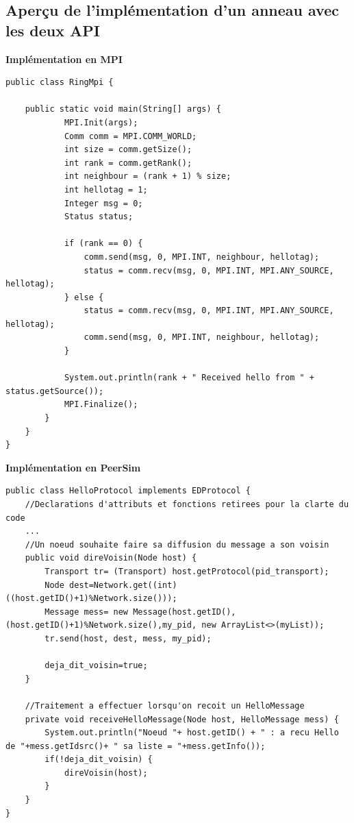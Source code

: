 \documentclass{article}
\begin{document}
			
			\subsection{Aperçu de l'implémentation d'un anneau avec les deux API}
                
            \vspace*{5mm}

                {\bfseries Implémentation en MPI}
				\begin{lstlisting}
public class RingMpi {

	public static void main(String[] args) {
			MPI.Init(args);
			Comm comm = MPI.COMM_WORLD;
			int size = comm.getSize();
			int rank = comm.getRank();
			int neighbour = (rank + 1) % size;
			int hellotag = 1;
			Integer msg = 0;
            Status status;
            
			if (rank == 0) {
				comm.send(msg, 0, MPI.INT, neighbour, hellotag);
				status = comm.recv(msg, 0, MPI.INT, MPI.ANY_SOURCE, hellotag);
			} else {
				status = comm.recv(msg, 0, MPI.INT, MPI.ANY_SOURCE, hellotag);
				comm.send(msg, 0, MPI.INT, neighbour, hellotag);
            }
            
			System.out.println(rank + " Received hello from " + status.getSource());
			MPI.Finalize();
		}
	}
}
                \end{lstlisting}
                \newpage
				{\bfseries Implémentation en PeerSim}
				\begin{lstlisting}
public class HelloProtocol implements EDProtocol {
	//Declarations d'attributs et fonctions retirees pour la clarte du code
	...
	//Un noeud souhaite faire sa diffusion du message a son voisin
	public void direVoisin(Node host) {
		Transport tr= (Transport) host.getProtocol(pid_transport);
		Node dest=Network.get((int) ((host.getID()+1)%Network.size()));
		Message mess= new Message(host.getID(),(host.getID()+1)%Network.size(),my_pid, new ArrayList<>(myList));
		tr.send(host, dest, mess, my_pid);

		deja_dit_voisin=true;
	}

	//Traitement a effectuer lorsqu'on recoit un HelloMessage
	private void receiveHelloMessage(Node host, HelloMessage mess) {
		System.out.println("Noeud "+ host.getID() + " : a recu Hello de "+mess.getIdsrc()+ " sa liste = "+mess.getInfo());
		if(!deja_dit_voisin) {
			direVoisin(host);
		}
	}
}
                \end{lstlisting}
                \vspace*{5mm}
\end{document}
